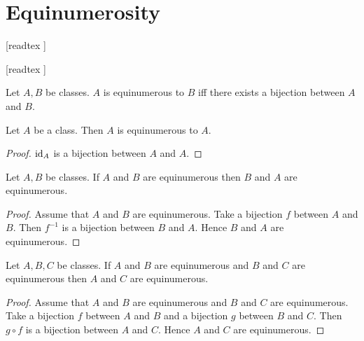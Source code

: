 \documentclass[../set-theory.tex]{subfiles}
\begin{document}
  \chapter{Equinumerosity}


  \begin{forthel}

    [readtex ]

    [readtex ]

  \end{forthel}


  \begin{forthel}
    \begin{definition}\label{SET_THEORY_13_4578620297183232}
      Let $A, B$ be classes.
      $A$ is equinumerous to $B$ iff there exists a bijection between $A$ and
      $B$.
    \end{definition}
  \end{forthel}

  \begin{forthel}
    \begin{proposition}\label{SET_THEORY_13_3703161885818880}
      Let $A$ be a class.
      Then $A$ is equinumerous to $A$.
    \end{proposition}
    \begin{proof}
      $\operatorname{id}_{A}$ is a bijection between $A$ and $A$.
    \end{proof}
  \end{forthel}

  \begin{forthel}
    \begin{proposition}\label{SET_THEORY_13_8050301789536256}
      Let $A, B$ be classes.
      If $A$ and $B$ are equinumerous then $B$ and $A$ are equinumerous.
    \end{proposition}
    \begin{proof}
      Assume that $A$ and $B$ are equinumerous.
      Take a bijection $f$ between $A$ and $B$.
      Then $f^{-1}$ is a bijection between $B$ and $A$.
      Hence $B$ and $A$ are equinumerous.
    \end{proof}
  \end{forthel}

  \begin{forthel}
    \begin{proposition}\label{SET_THEORY_13_3609912414306304}
      Let $A, B, C$ be classes.
      If $A$ and $B$ are equinumerous and $B$ and $C$ are equinumerous then
      $A$ and $C$ are equinumerous.
    \end{proposition}
    \begin{proof}
      Assume that $A$ and $B$ are equinumerous and $B$ and $C$ are
      equinumerous.
      Take a bijection $f$ between $A$ and $B$ and a bijection $g$ between
      $B$ and $C$.
      Then $g \circ f$ is a bijection between $A$ and $C$.
      Hence $A$ and $C$ are equinumerous.
    \end{proof}
  \end{forthel}
\end{document}
